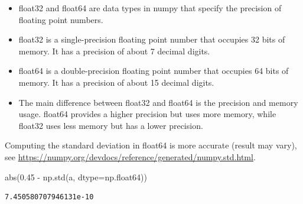 \documentclass[
  letterpaper,
  DIV=11,
  numbers=noendperiod]{scrreprt}
\newenvironment{Shaded}{\begin{snugshade}}{\end{snugshade}}
\newcommand{\BuiltInTok}[1]{\textcolor[rgb]{0.00,0.23,0.31}{#1}}
\newcommand{\FloatTok}[1]{\textcolor[rgb]{0.68,0.00,0.00}{#1}}
\newcommand{\NormalTok}[1]{\textcolor[rgb]{0.00,0.23,0.31}{#1}}
\newcommand{\OperatorTok}[1]{\textcolor[rgb]{0.37,0.37,0.37}{#1}}
\providecommand{\tightlist}{%
  \setlength{\itemsep}{0pt}\setlength{\parskip}{0pt}}\usepackage{longtable,booktabs,array}
\begin{document}
\begin{tcolorbox}[enhanced jigsaw, arc=.35mm, colback=white, bottomtitle=1mm, toprule=.15mm, coltitle=black, titlerule=0mm, leftrule=.75mm, title=\textcolor{quarto-callout-note-color}{\faInfo}\hspace{0.5em}{Float data types}, opacitybacktitle=0.6, breakable, colbacktitle=quarto-callout-note-color!10!white, opacityback=0, toptitle=1mm, rightrule=.15mm, left=2mm, colframe=quarto-callout-note-color-frame, bottomrule=.15mm]

\begin{itemize}
\tightlist
\item
  float32 and float64 are data types in numpy that specify the precision
  of floating point numbers.
\item
  float32 is a single-precision floating point number that occupies 32
  bits of memory. It has a precision of about 7 decimal digits.
\item
  float64 is a double-precision floating point number that occupies 64
  bits of memory. It has a precision of about 15 decimal digits.
\item
  The main difference between float32 and float64 is the precision and
  memory usage. float64 provides a higher precision but uses more
  memory, while float32 uses less memory but has a lower precision.
\end{itemize}

\end{tcolorbox}

Computing the standard deviation in float64 is more accurate (result may
vary), see
\url{https://numpy.org/devdocs/reference/generated/numpy.std.html}.

\begin{Shaded}
\begin{Highlighting}[]
\BuiltInTok{abs}\NormalTok{(}\FloatTok{0.45} \OperatorTok{{-}}\NormalTok{ np.std(a, dtype}\OperatorTok{=}\NormalTok{np.float64))}
\end{Highlighting}
\end{Shaded}

\begin{verbatim}
7.450580707946131e-10
\end{verbatim}
\end{document}
